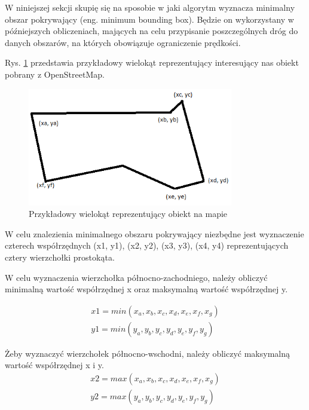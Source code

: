 W niniejszej sekcji skupię się na sposobie w jaki algorytm wyznacza minimalny obszar pokrywający (eng. minimum bounding box). Będzie on wykorzystany w późniejszych obliczeniach, mających na celu przypisanie poszczególnych dróg do danych obszarów, na których obowiązuje ograniczenie prędkości.

Rys. \ref{sec:minBoundingBoxFirst} przedstawia przykładowy wielokąt reprezentujący interesujący nas obiekt pobrany z OpenStreetMap.

\begin{figure}[h]
\caption{Przykładowy wielokąt reprezentujący obiekt na mapie}
\label{sec:minBoundingBoxFirst}
\centering
\includegraphics[width=0.8\textwidth]{minBoundingBoxFirst}
\end{figure}

W celu znalezienia minimalnego obszaru pokrywający niezbędne jest wyznaczenie czterech współrzędnych (x1, y1), (x2, y2), (x3, y3), (x4, y4) reprezentujących cztery wierzchołki prostokąta.

W celu wyznaczenia wierzchołka północno-zachodniego, należy obliczyć minimalną wartość współrzędnej x oraz maksymalną wartość współrzędnej y.

\begin{equation} \label{sec:drugiWierzcholek}
\begin{split}
x1 = min(x_a, x_b, x_c, x_d, x_e, x_f, x_g) \\
y1 = min(y_a, y_b, y_c, y_d, y_e, y_f, y_g)
\end{split}
\end{equation}\newline

Żeby wyznaczyć wierzchołek północno-wschodni, należy obliczyć maksymalną wartość współrzędnej x i y.
\begin{equation} \label{sec:trzeciWierzcholek}
\begin{split}
x2 = max(x_a, x_b, x_c, x_d, x_e, x_f, x_g)  \\
y2 = max(y_a, y_b, y_c, y_d, y_e, y_f, y_g)
\end{split}
\end{equation}\newline

